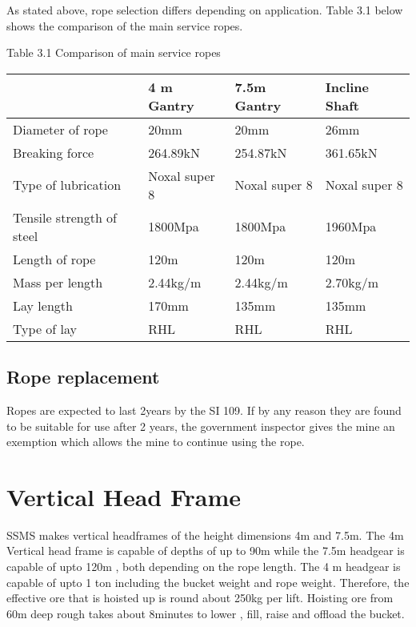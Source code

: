 \noindent As stated above, rope selection differs depending on application. Table 3.1 below shows the comparison of the main service ropes.\par

\noindent Table 3.1 Comparison of main service ropes

\begin{tabular}{|p{1.3in}|p{0.8in}|p{0.8in}|p{1.1in}|} \hline 
 & 4 m Gantry & 7.5m Gantry & Incline Shaft \\ \hline 
Diameter of rope & 20mm & 20mm & 26mm \\ \hline 
Breaking force & 264.89kN & 254.87kN & 361.65kN \\ \hline 
Type of lubrication & Noxal super 8 & Noxal super 8 & Noxal super 8 \\ \hline 
Tensile strength of steel & 1800Mpa & 1800Mpa & 1960Mpa \\ \hline 
Length of rope & 120m & 120m & 120m \\ \hline 
Mass per length & 2.44kg/m & 2.44kg/m & 2.70kg/m \\ \hline 
Lay length & 170mm & 135mm & 135mm \\ \hline 
Type of lay & RHL & RHL & RHL \\ \hline 
\end{tabular}


\subsection{ Rope replacement }

\noindent Ropes are expected to last 2years by the SI 109. If by any reason they are found to be suitable for use after 2 years, the government inspector gives the mine an exemption which allows the mine to continue using the rope.\par


\section{ Vertical Head Frame}

\noindent SSMS makes vertical headframes of the height dimensions 4m and 7.5m. The 4m Vertical head frame is capable of depths of up to 90m while the 7.5m headgear is capable of upto 120m , both depending on the rope length. The 4 m headgear is capable of upto 1 ton including the bucket weight and rope weight. Therefore, the effective ore that is hoisted up is round about 250kg per lift. Hoisting ore from 60m deep rough takes about 8minutes to lower , fill, raise and offload the bucket.\par 

